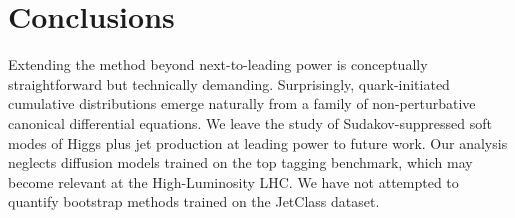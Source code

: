 \section{Conclusions}\label{sec:conclusions}

Extending the method beyond next-to-leading power is conceptually
straightforward but technically demanding. Surprisingly, quark-initiated
cumulative distributions emerge naturally from a family of
non-perturbative canonical differential equations. We leave the study of
Sudakov-suppressed soft modes of Higgs plus jet production at leading
power to future work. Our analysis neglects diffusion models trained on
the top tagging benchmark, which may become relevant at the
High-Luminosity LHC. We have not attempted to quantify bootstrap methods
trained on the JetClass dataset.

